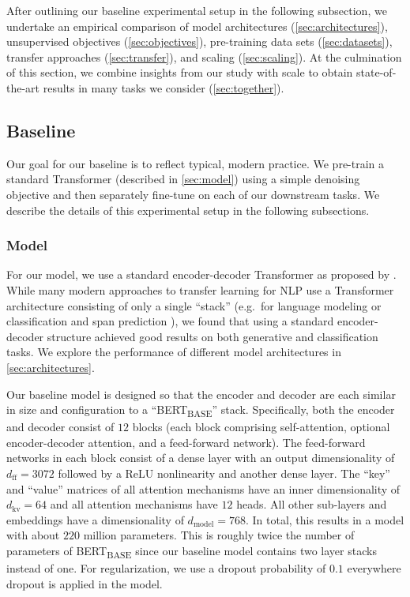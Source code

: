 \documentclass[twoside,11pt]{article}
\begin{document}
After outlining our baseline experimental setup in the following subsection, we undertake an empirical comparison of model architectures (\cref{sec:architectures}), unsupervised objectives (\cref{sec:objectives}), pre-training data sets (\cref{sec:datasets}), transfer approaches (\cref{sec:transfer}), and scaling (\cref{sec:scaling}).
At the culmination of this section, we combine insights from our study with scale to obtain state-of-the-art results in many tasks we consider (\cref{sec:together}).

\subsection{Baseline}
\label{sec:baseline}

Our goal for our baseline is to reflect typical, modern practice.
We pre-train a standard Transformer (described in \cref{sec:model}) using a simple denoising objective and then separately fine-tune on each of our downstream tasks.
We describe the details of this experimental setup in the following subsections.

\subsubsection{Model}
\label{sec:model_hparams}

For our model, we use a standard encoder-decoder Transformer as proposed by \cite{vaswani2017attention}.
While many modern approaches to transfer learning for NLP use a Transformer architecture consisting of only a single ``stack'' (e.g.\ for language modeling \citep{radford2018improving,dong2019unified} or classification and span prediction \citep{devlin2018bert,yang2019xlnet}), we found that using a standard encoder-decoder structure achieved good results on both generative and classification tasks.
We explore the performance of different model architectures in \cref{sec:architectures}.

Our baseline model is designed so that the encoder and decoder are each similar in size and configuration to a ``BERT\textsubscript{BASE}'' \citep{devlin2018bert} stack.
Specifically, both the encoder and decoder consist of $12$ blocks (each block comprising self-attention, optional encoder-decoder attention, and a feed-forward network).
The feed-forward networks in each block consist of a dense layer with an output dimensionality of $d_{\mathrm{ff}} = 3072$ followed by a ReLU nonlinearity and another dense layer.
The ``key'' and ``value'' matrices of all attention mechanisms have an inner dimensionality of $d_{\mathrm{kv}} = 64$ and all attention mechanisms have $12$ heads.
All other sub-layers and embeddings have a dimensionality of $d_{\mathrm{model}} = 768$.
In total, this results in a model with about $220$ million parameters.
This is roughly twice the number of parameters of BERT\textsubscript{BASE} since our baseline model contains two layer stacks instead of one.
For regularization, we use a dropout probability of $0.1$ everywhere dropout is applied in the model.
\end{document}
